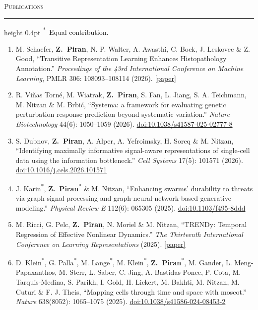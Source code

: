 \documentclass[11pt,letterpaper]{article}
\newcommand{\cvsection}[1]{%
  \par\addvspace{13pt}\Needspace{5\baselineskip}%
  {\large\scshape #1}\par\vspace{3pt}\hrule height 0.4pt\vspace{7pt}}
\newcommand{\me}{\textbf{Z.~Piran}}
\newcommand{\equal}{\textsuperscript{*}}
\begin{document}
\clearpage
\cvsection{Publications}
{\small \equal\ Equal contribution.}\par
\begin{enumerate}
\item M. Schaefer, \me{}, N. P. Walter, A. Awasthi, C. Bock, J. Leskovec \& Z. Good, ``Transitive Representation Learning Enhances Histopathology Annotation.'' \textit{Proceedings of the 43rd International Conference on Machine Learning}, PMLR 306: 108093--108114 (2026). \href{https://proceedings.mlr.press/v306/schaefer26a.html}{[paper]}

\item R. Vi\~nas Torn\'e, M. Wiatrak, \me{}, S. Fan, L. Jiang, S. A. Teichmann, M. Nitzan \& M. Brbi\'c, ``Systema: a framework for evaluating genetic perturbation response prediction beyond systematic variation.'' \textit{Nature Biotechnology} 44(6): 1050--1059 (2026). \href{https://doi.org/10.1038/s41587-025-02777-8}{doi:10.1038/s41587-025-02777-8}

\item S. Dubnov, \me{}, A. Alper, A. Yefroimsky, H. Soreq \& M. Nitzan, ``Identifying maximally informative signal-aware representations of single-cell data using the information bottleneck.'' \textit{Cell Systems} 17(5): 101571 (2026). \href{https://doi.org/10.1016/j.cels.2026.101571}{doi:10.1016/j.cels.2026.101571}

\item J. Karin\equal{}, \me{}\equal{} \& M. Nitzan, ``Enhancing swarms' durability to threats via graph signal processing and graph-neural-network-based generative modeling.'' \textit{Physical Review E} 112(6): 065305 (2025). \href{https://doi.org/10.1103/f495-8ddd}{doi:10.1103/f495-8ddd}

\item M. Ricci, G. Pelc, \me{}, N. Moriel \& M. Nitzan, ``TRENDy: Temporal Regression of Effective Nonlinear Dynamics.'' \textit{The Thirteenth International Conference on Learning Representations} (2025). \href{https://openreview.net/forum?id=NvDRvtrGLo}{[paper]}

\item D. Klein\equal{}, G. Palla\equal{}, M. Lange\equal{}, M. Klein\equal{}, \me{}\equal{}, M. Gander, L. Meng-Papaxanthos, M. Sterr, L. Saber, C. Jing, A. Bastidas-Ponce, P. Cota, M. Tarquis-Medina, S. Parikh, I. Gold, H. Lickert, M. Bakhti, M. Nitzan, M. Cuturi \& F. J. Theis, ``Mapping cells through time and space with moscot.'' \textit{Nature} 638(8052): 1065--1075 (2025). \href{https://doi.org/10.1038/s41586-024-08453-2}{doi:10.1038/s41586-024-08453-2}


\end{enumerate}
\end{document}
